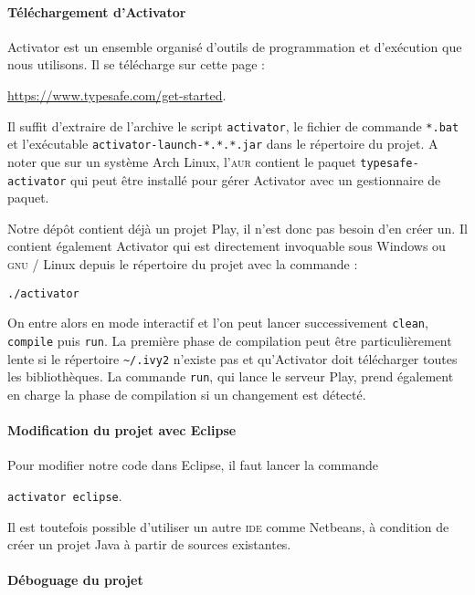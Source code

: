 \documentclass[11pt]{article}
\begin{document}
\paragraph{Téléchargement d'Activator}

Activator est un ensemble organisé d'outils de programmation et d'exécution que nous utilisons. Il se télécharge sur cette page : \begin{center}\url{https://www.typesafe.com/get-started}.\end{center}Il suffit d'extraire de l'archive le script \texttt{activator}, le fichier de commande \texttt{*.bat} et l'exécutable \texttt{activator-launch-*.*.*.jar} dans le répertoire du projet. A noter que sur un système Arch Linux, l'\textsc{aur} contient le paquet \texttt{typesafe-activator} qui peut être installé pour gérer Activator avec un gestionnaire de paquet. 

Notre dépôt contient déjà un projet Play, il n'est donc pas besoin d'en créer un. Il contient également Activator qui est directement invoquable sous Windows ou \textsc{gnu} / Linux depuis le répertoire du projet avec la commande : 
\begin{center}\texttt{./activator}\end{center} On entre alors en mode interactif et l'on peut lancer successivement \texttt{clean}, \texttt{compile} puis \texttt{run}. La première phase de compilation peut être particulièrement lente si le répertoire \texttt{\textasciitilde/.ivy2} n'existe pas et qu'Activator doit télécharger toutes les bibliothèques. La commande \texttt{run}, qui lance le serveur Play, prend également en charge la phase de compilation si un changement est détecté.

\paragraph{Modification du projet avec Eclipse}

Pour modifier notre code dans Eclipse, il faut lancer la commande
\begin{center}\texttt{activator eclipse}.\end{center}
Il est toutefois possible d'utiliser un autre \textsc{ide} comme Netbeans, à condition de créer un projet Java à partir de sources existantes.

\paragraph{Déboguage du projet}
\end{document}
